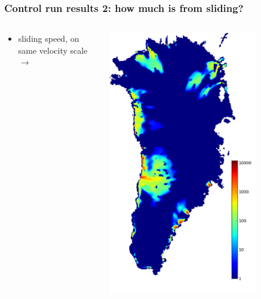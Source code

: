 \documentclass{beamer}
\begin{document}
\begin{frame}
  \frametitle{Control run results 2: how much is from sliding?}

\begin{columns}
\begin{column}{0.6\textwidth}
\begin{itemize}
\item sliding speed, on same velocity scale $\to$
\end{itemize}
\end{column}
\begin{column}{0.4\textwidth}
\begin{center}
  \includegraphics[width=0.75\textwidth]{g3km_3_25_98_cbase}
\end{center}
\end{column}
\end{columns}
\end{frame}
\end{document}
